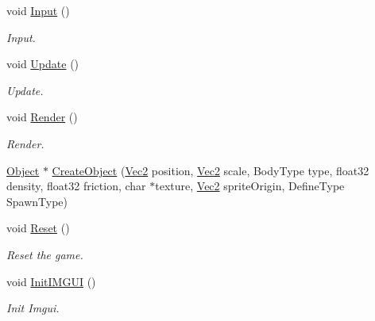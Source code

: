 \begin{DoxyCompactItemize}
void \hyperlink{class_game_manager_a3aa49c2431d703ba1a5aa9183589e593}{Input} ()
\begin{DoxyCompactList}\small\item\em Input. \end{DoxyCompactList}\item 
\mbox{\label{class_game_manager_af3bb4452ac262ec8a68dcc3eea2f0124}} 
void \hyperlink{class_game_manager_af3bb4452ac262ec8a68dcc3eea2f0124}{Update} ()
\begin{DoxyCompactList}\small\item\em Update. \end{DoxyCompactList}\item 
\mbox{\label{class_game_manager_ac1bd6de1844831d097b24a13a0e6a5a5}} 
void \hyperlink{class_game_manager_ac1bd6de1844831d097b24a13a0e6a5a5}{Render} ()
\begin{DoxyCompactList}\small\item\em Render. \end{DoxyCompactList}\item 
\hyperlink{class_object}{Object} $\ast$ \hyperlink{class_game_manager_acc61ce12b7ed93580b4a585389bcc968}{Create\+Object} (\hyperlink{struct_vec2}{Vec2} position, \hyperlink{struct_vec2}{Vec2} scale, Body\+Type type, float32 density, float32 friction, char $\ast$texture, \hyperlink{struct_vec2}{Vec2} sprite\+Origin, Define\+Type Spawn\+Type)
\item 
\mbox{\label{class_game_manager_a53219287fbbdd657a2fc34316d83665b}} 
void \hyperlink{class_game_manager_a53219287fbbdd657a2fc34316d83665b}{Reset} ()
\begin{DoxyCompactList}\small\item\em Reset the game. \end{DoxyCompactList}\item 
\mbox{\label{class_game_manager_a472b4130e5cff04138c30189d2b3f890}} 
void \hyperlink{class_game_manager_a472b4130e5cff04138c30189d2b3f890}{Init\+I\+M\+G\+UI} ()
\begin{DoxyCompactList}\small\item\em Init Imgui. \end{DoxyCompactList}\item 
\mbox{\label{class_game_manager_ae8672e78febd97d68dd42b9e843b3527}} 

\end{DoxyCompactItemize}
